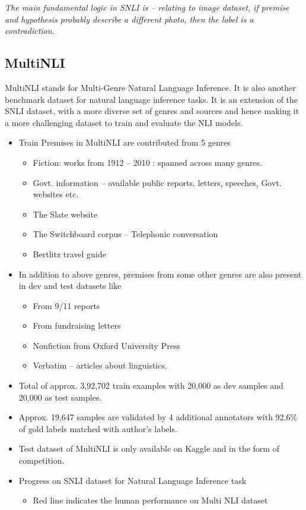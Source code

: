 	\textit{The main fundamental logic in SNLI is – relating to image dataset, if premise and hypothesis probably describe a different photo, then the label is a contradiction.}

\subsection{MultiNLI}

MultiNLI stands for Multi-Genre Natural Language Inference. It is also another benchmark dataset for natural language inference tasks. It is an extension of the SNLI dataset, with a more diverse set of genres and sources and hence making it a more challenging dataset to train and evaluate the NLI models.
\begin{itemize}
	\item Train Premises in MultiNLI are contributed from 5 genres
	\begin{itemize}
		\item Fiction: works from 1912 – 2010 : spanned across many genres.
		\item Govt. information – available public reports, letters, speeches, Govt. websites etc.
		\item The Slate website
		\item The Switchboard corpus – Telephonic conversation
		\item Bertlitz travel guide
	\end{itemize}
	\item In addition to above genres, premises from some other genres are also present in dev and test datasets like
	\begin{itemize}
		\item From 9/11 reports
		\item From fundraising letters
		\item Nonfiction from Oxford University Press
		\item Verbatim – articles about linguistics.
	\end{itemize}
	\item Total of approx. 3,92,702 train examples with 20,000 as dev samples and 20,000 as test samples.
	\item Approx. 19,647 samples are validated by 4 additional annotators with 92.6\% of gold labels matched with author’s labels.
	\item Test dataset of MultiNLI is only available on Kaggle and in the form of competition.
	\item Progress on SNLI dataset for Natural Language Inference task
	\begin{itemize}
		\item Red line indicates the human performance on Multi NLI dataset
	\end{itemize}
\end{itemize}

